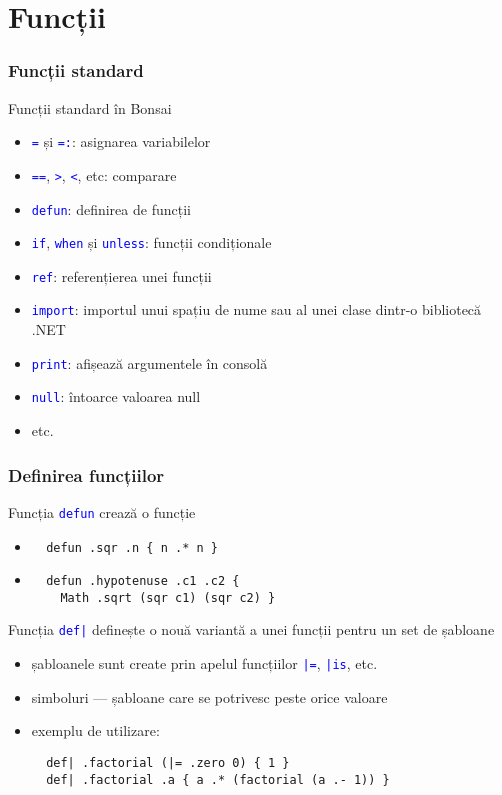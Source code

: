 \documentclass{beamer}
\renewcommand{\c}[1]{\textcolor{blue}{\texttt{#1}}}
\begin{document}
\section{Funcții}
\begin{frame}
  \frametitle{Funcții standard}
  Funcții standard în Bonsai
  \begin{itemize}
    \item \c{=} și \c{=:}: asignarea variabilelor
    \item \c{==}, \c{>}, \c{<}, etc: comparare 
    \item \c{defun}: definirea de funcții
    \item \c{if}, \c{when} și \c{unless}: funcții condiționale
    \item \c{ref}: referențierea unei funcții
    \item \c{import}: importul unui spațiu de nume sau al unei clase dintr-o bibliotecă .NET
    \item \c{print}: afișează argumentele în consolă
    \item \c{null}: întoarce valoarea null
    \item etc.
  \end{itemize}
\end{frame}

\begin{frame}[containsverbatim]
  \frametitle{Definirea funcțiilor}
  Funcția \c{defun} crează o funcție
  \begin{itemize}
  \item
    \color{blue}
    \begin{verbatim}
  defun .sqr .n { n .* n }\end{verbatim}
  \item
    \begin{verbatim}
  defun .hypotenuse .c1 .c2 { 
    Math .sqrt (sqr c1) (sqr c2) }\end{verbatim}
    \color{black}
  \end{itemize}
  \vskip8pt
  Funcția \c{def|} definește o nouă variantă a unei funcții pentru un set de șabloane
  \begin{itemize}
  \item șabloanele sunt create prin apelul funcțiilor \c{|=}, \c{|is}, etc.
  \item simboluri — șabloane care se potrivesc peste orice valoare
  \item exemplu de utilizare:
    \color{blue}
    \begin{verbatim}
  def| .factorial (|= .zero 0) { 1 }
  def| .factorial .a { a .* (factorial (a .- 1)) }\end{verbatim}
    \color{black}
  \end{itemize}
\end{frame}
\end{document}

